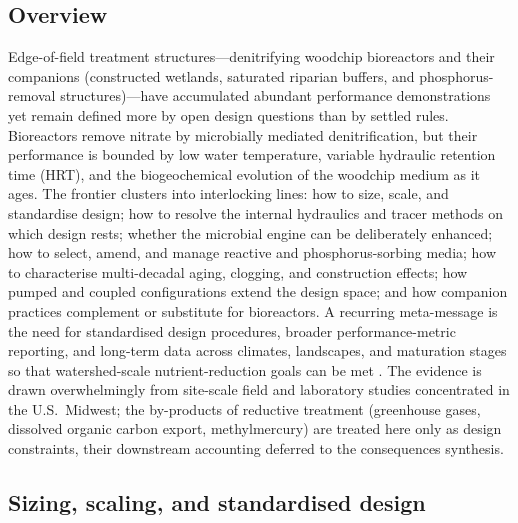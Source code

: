 \subsection{Overview}

Edge-of-field treatment structures---denitrifying woodchip bioreactors and
their companions (constructed wetlands, saturated riparian buffers, and
phosphorus-removal structures)---have accumulated abundant performance
demonstrations yet remain defined more by open design questions than by settled
rules. Bioreactors remove nitrate by microbially mediated denitrification, but
their performance is bounded by low water temperature, variable hydraulic
retention time (HRT), and the biogeochemical evolution of the woodchip medium as
it ages. The frontier clusters into interlocking lines: how to size, scale, and
standardise design; how to resolve the internal hydraulics and tracer methods on
which design rests; whether the microbial engine can be deliberately enhanced;
how to select, amend, and manage reactive and phosphorus-sorbing media; how to
characterise multi-decadal aging, clogging, and construction effects; how
pumped and coupled configurations extend the design space; and how companion
practices complement or substitute for bioreactors. A recurring meta-message is
the need for standardised design procedures, broader performance-metric
reporting, and long-term data across climates, landscapes, and maturation stages
so that watershed-scale nutrient-reduction goals can be met
\parencite{Christianson2021,Maxwell2022,Bell2015}. The evidence is drawn
overwhelmingly from site-scale field and laboratory studies concentrated in the
U.S.\ Midwest; the by-products of reductive treatment (greenhouse gases,
dissolved organic carbon export, methylmercury) are treated here only as design
constraints, their downstream accounting deferred to the consequences synthesis.

\subsection{Sizing, scaling, and standardised design}

